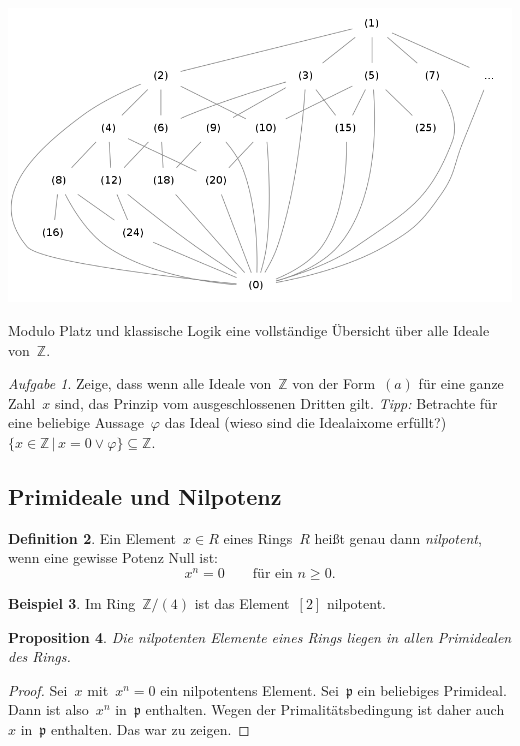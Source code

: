 \documentclass[a4paper,ngerman,12pt]{scrartcl}
\theoremstyle{definition}
\newtheorem{defn}{Definition}[section]
\newtheorem{bsp}[defn]{Beispiel}
\theoremstyle{plain}
\newtheorem{prop}[defn]{Proposition}
\theoremstyle{remark}
\newtheorem{aufg}[defn]{Aufgabe}
\newcommand{\ZZ}{\mathbb{Z}}
\newcommand{\pp}{\mathfrak{p}}
\renewcommand{\_}{\mathpunct{.}\,}
\newcommand{\?}{\,{:}\,}
\begin{document}
\begin{table}
  \centering
  \includegraphics[scale=0.4]{ideale-z}
  \caption{\label{ideale:z}Modulo Platz und klassische Logik eine
  vollständige Übersicht über alle Ideale von~$\ZZ$.}
\end{table}

\begin{aufg}Zeige, dass wenn alle Ideale von~$\ZZ$ von der Form~$(a)$ für
eine ganze Zahl~$x$ sind, das Prinzip vom ausgeschlossenen Dritten gilt.
\emph{Tipp:} Betrachte für eine beliebige Aussage~$\varphi$ das Ideal (wieso
sind die Idealaixome erfüllt?) $\{ x \in \ZZ
\,|\, x = 0 \vee \varphi \} \subseteq \ZZ$.\end{aufg}


\subsection{Primideale und Nilpotenz}

\begin{defn}Ein Element~$x \in R$ eines Rings~$R$ heißt genau dann
\emph{nilpotent}, wenn eine gewisse Potenz Null ist:
\[ x^n = 0 \qquad\text{für ein~$n \geq 0$}. \]
\end{defn}

\begin{bsp}Im Ring~$\ZZ/(4)$ ist das Element~$[2]$ nilpotent.\end{bsp}

\begin{prop}Die nilpotenten Elemente eines Rings liegen in allen Primidealen
des Rings.\end{prop}
\begin{proof}Sei~$x$ mit~$x^n = 0$ ein nilpotentens Element. Sei~$\pp$ ein
beliebiges Primideal. Dann ist also~$x^n$ in~$\pp$ enthalten. Wegen der
Primalitätsbedingung ist daher auch~$x$ in~$\pp$ enthalten. Das war zu
zeigen.\end{proof}
\end{document}
